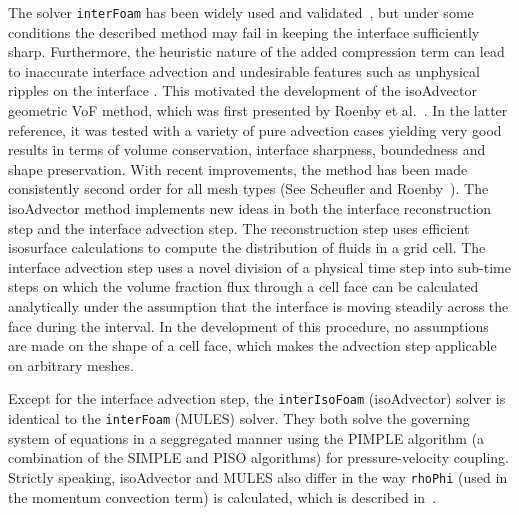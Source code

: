 \documentclass[review]{elsarticle}
\begin{document}
The solver \verb+interFoam+ has been widely used and validated~\cite{MARSCHALL2012,RAEINI2012,HOANG2013,BILGER2017}, but under some conditions the described method may fail in keeping the interface sufficiently sharp. Furthermore, the heuristic nature of the added compression term can lead to inaccurate interface advection and undesirable features such as unphysical ripples on the interface \cite{roenby_new_2017,roenby_isoadvector:_2018}. This motivated the development of the isoAdvector geometric VoF method, which was first presented by Roenby et al.~\cite{Roenby160405}. In the latter reference, it was tested with a variety of pure advection cases yielding very good results in terms of volume conservation, interface sharpness, boundedness and shape preservation. 
With recent improvements, the method has been made consistently second order for all mesh types (See Scheufler and Roenby~\cite{Scheufler2018}). The isoAdvector method implements new ideas in both the interface reconstruction step and the interface advection step.
The reconstruction step uses efficient isosurface calculations to compute the distribution
of fluids in a grid cell. The interface advection step uses a novel division of
a physical time step into sub-time steps on which the volume fraction flux through a 
cell face can be calculated analytically under the assumption that the interface is moving 
steadily across the face during the interval. In the development of this procedure, 
no assumptions are made on the shape of a cell face, which makes the advection step 
applicable on arbitrary meshes.

Except for the interface advection step, the \verb+interIsoFoam+ (isoAdvector) solver is identical to the \verb+interFoam+ (MULES) solver. They both solve the governing system of equations in a seggregated manner using the PIMPLE algorithm (a combination of the SIMPLE and PISO algorithms) for pressure-velocity coupling. 
Strictly speaking, isoAdvector and MULES also differ in the way \verb+rhoPhi+ (used in the momentum convection term) is calculated, which is described in~\cite{roenby_isoadvector:_2018}.

\end{document}
